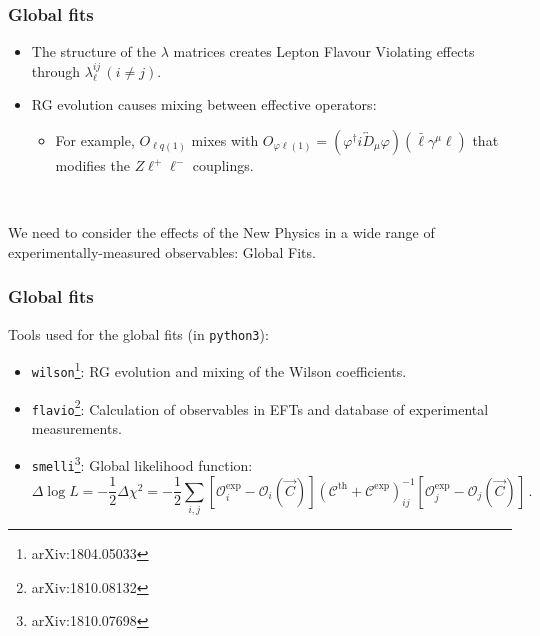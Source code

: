 \documentclass[mathserif, 10pt]{beamer}
\begin{document}
\begin{frame}
    \frametitle{Global fits}
    \begin{itemize}
        \item The structure of the $\lambda$ matrices creates Lepton Flavour Violating effects through $\lambda_\ell^{ij}\, (i\neq j)$.
        \item RG evolution causes mixing between effective operators:
              \begin{itemize}
                  \item For example, $O_{\ell q(1)}$ mixes with $O_{\varphi \ell(1)} = (\varphi^\dagger i \overleftrightarrow D_{\mu} \varphi)(\bar{\ell} \gamma^\mu \ell )$ that modifies the $Z\ell^+\ell^-$ couplings.
              \end{itemize}
    \end{itemize}

    ~

    We need to consider the effects of the New Physics in a wide range of experimentally-measured observables: Global Fits.


\end{frame}

\begin{frame}
    \frametitle{Global fits}

    Tools used for the global fits (in \texttt{python3}):
    \begin{itemize}
        \item \texttt{wilson}\footnote[1]{arXiv:1804.05033}: RG evolution and mixing of the Wilson coefficients.
        \item \texttt{flavio}\footnote[2]{arXiv:1810.08132}: Calculation of observables in EFTs and database of experimental measurements.
        \item \texttt{smelli}\footnote[3]{arXiv:1810.07698}: Global likelihood function:
              {\small$$\Delta \log L = -\frac{1}{2}\Delta\chi^2 = -\frac{1}{2}\sum_{i,j} [\mathcal{O}_i^\mathrm{exp} - \mathcal{O}_i(\vec{C})] (\mathcal{C}^\mathrm{th}+\mathcal{C}^\mathrm{exp})^{-1}_{ij} [\mathcal{O}_j^\mathrm{exp} - \mathcal{O}_j(\vec{C})]\,. $$} %
    \end{itemize}

\end{frame}
\end{document}
